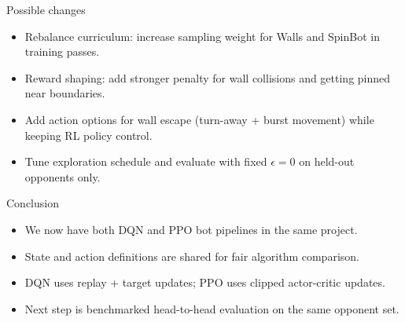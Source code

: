 \documentclass[12pt,aspectratio=169]{beamer}
\begin{document}
\begin{frame}{Possible changes}
\begin{itemize}
  \item Rebalance curriculum: increase sampling weight for Walls and SpinBot in training passes.
  \item Reward shaping: add stronger penalty for wall collisions and getting pinned near boundaries.
  \item Add action options for wall escape (turn-away + burst movement) while keeping RL policy control.
  \item Tune exploration schedule and evaluate with fixed $\epsilon=0$ on held-out opponents only.
\end{itemize}
\end{frame}


\begin{frame}{Conclusion}
\begin{itemize}
  \item We now have both DQN and PPO bot pipelines in the same project.
  \item State and action definitions are shared for fair algorithm comparison.
  \item DQN uses replay + target updates; PPO uses clipped actor-critic updates.
  \item Next step is benchmarked head-to-head evaluation on the same opponent set.
\end{itemize}
\end{frame}
\end{document}
